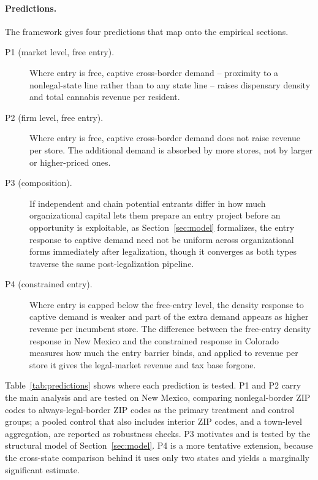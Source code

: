\documentclass[english,12pt]{article}
\begin{document}
\paragraph{Predictions.} The framework gives four predictions that map onto the empirical sections.

\begin{description}
\item[P1 (market level, free entry).] Where entry is free, captive cross-border demand -- proximity to a nonlegal-state line rather than to any state line -- raises dispensary density and total cannabis revenue per resident.
\item[P2 (firm level, free entry).] Where entry is free, captive cross-border demand does not raise revenue per store. The additional demand is absorbed by more stores, not by larger or higher-priced ones.
\item[P3 (composition).] If independent and chain potential entrants differ in how much organizational capital lets them prepare an entry project before an opportunity is exploitable, as Section~\ref{sec:model} formalizes, the entry response to captive demand need not be uniform across organizational forms immediately after legalization, though it converges as both types traverse the same post-legalization pipeline.
\item[P4 (constrained entry).] Where entry is capped below the free-entry level, the density response to captive demand is weaker and part of the extra demand appears as higher revenue per incumbent store. The difference between the free-entry density response in New Mexico and the constrained response in Colorado measures how much the entry barrier binds, and applied to revenue per store it gives the legal-market revenue and tax base forgone.
\end{description}

Table~\ref{tab:predictions} shows where each prediction is tested. P1 and P2 carry the main analysis and are tested on New Mexico, comparing nonlegal-border ZIP codes to always-legal-border ZIP codes as the primary treatment and control groups; a pooled control that also includes interior ZIP codes, and a town-level aggregation, are reported as robustness checks. P3 motivates and is tested by the structural model of Section~\ref{sec:model}. P4 is a more tentative extension, because the cross-state comparison behind it uses only two states and yields a marginally significant estimate.
\end{document}
